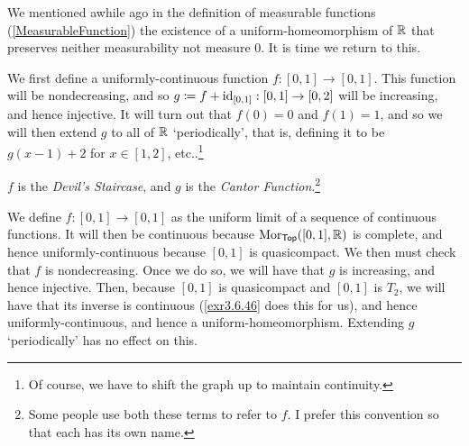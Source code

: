 We mentioned awhile ago in the definition of measurable functions (\cref{MeasurableFunction}) the existence of a uniform-homeomorphism of $\mathbb{R}$ that preserves neither measurability not measure $0$.  It is time we return to this.
\begin{exm}\label{CantorFunction}
We first define a uniformly-continuous function $f:[0,1]\rightarrow [0,1]$.  This function will be nondecreasing, and so $g\coloneqq f+\operatorname{id} _{[0,1]}:[0,1]\rightarrow [0,2]$ will be increasing, and hence injective.  It will turn out that $f(0)=0$ and $f(1)=1$, and so we will then extend $g$ to all of $\mathbb{R}$ `periodically', that is, defining it to be $g(x-1)+2$ for $x\in [1,2]$, etc..\footnote{Of course, we have to shift the graph up to maintain continuity.} 
\begin{rmk}
$f$ is the \emph{Devil's Staircase}, and $g$ is the \emph{Cantor Function}.\footnote{Some people use both these terms to refer to $f$.  I prefer this convention so that each has its own name.}
\end{rmk}

We define $f:[0,1]\rightarrow [0,1]$ as the uniform limit of a sequence of continuous functions.  It will then be continuous because $\operatorname{Mor} _{\mathsf{Top}}([0,1],\mathbb{R} )$ is complete, and hence uniformly-continuous because $[0,1]$ is quasicompact.  We then must check that $f$ is nondecreasing.  Once we do so, we will have that $g$ is increasing, and hence injective.  Then, because $[0,1]$ is quasicompact and $[0,1]$ is $T_2$, we will have that its inverse is continuous (\cref{exr3.6.46} does this for us), and hence uniformly-continuous, and hence a uniform-homeomorphism.  Extending $g$ `periodically' has no effect on this.


\end{exm}

